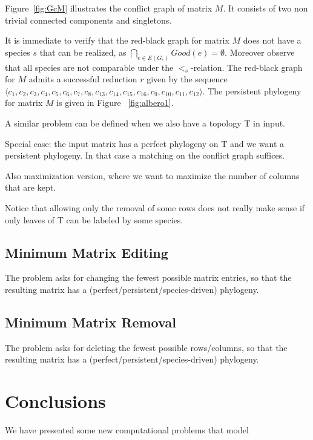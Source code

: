 Figure~\ref{fig:GcM} illustrates the conflict graph of matrix $M$. It consists
of two non trivial connected components and singletons.

It is immediate to verify that the red-black graph for matrix $M$ does not have
a species $s$ that can be realized, as  $\bigcap_{e \in E(G_c)}Good(e) =
\emptyset$.
Moreover observe that all species are not comparable under the $<_s$-relation.
The red-black graph  for $M$   admits a successful reduction   $r $ given by
the sequence $\langle c_1, c_2, c_3, c_4, c_5, c_6, c_7, c_8, c_{13}, c_{14},
c_{15}, c_{16}, c_9, c_{10}, c_{11}, c_{12} \rangle$.
The persistent phylogeny for matrix $M$ is given in Figure ~\ref{fig:albero1}.



A similar problem can be defined when we also have a topology T in input.

Special case: the input matrix has a perfect phylogeny on T and we want a persistent phylogeny. In that case a matching on the conflict graph suffices.

Also maximization version, where we want to maximize the number of columns that are kept.

Notice that allowing only the removal of some rows does not really make sense if only leaves of T can be labeled by some species.

\subsection{Minimum Matrix Editing}

The problem asks for changing the fewest possible matrix entries, so that the resulting matrix has a (perfect/persistent/species-driven) phylogeny. 

\subsection{Minimum Matrix Removal}

The problem asks for deleting the fewest possible rows/columns, so that the resulting matrix has a (perfect/persistent/species-driven) phylogeny.

\section{Conclusions}

We have presented some new computational problems that model\cite{bonizzoni_when_2014}



